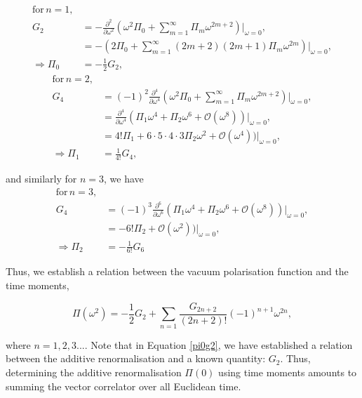 \documentclass{article}
\numberwithin{equation}{section} %
\begin{document}
\begin{equation}
\begin{split}
\mathrm{for}\, n=1,&\\
G_2 &= -\frac{\partial^{2}}{\partial \omega^{2}} (\omega^2 \Pi_0 + \sum_{m=1}^\infty \Pi_m \omega^{2m+2})\bigg \vert_{\omega=0} ,\\
&= -(2\Pi_0 + \sum_{m=1}^\infty (2m+2)(2m+1)\Pi_m \omega^{2m})\bigg \vert_{\omega=0} ,\\
\label{pi0g2}\Rightarrow \Pi_0 &= -\frac{1}{2}G_2,
\end{split}
\end{equation}
\begin{equation}
\begin{split}
\mathrm{for}\, n=2,&\\
G_4 &= (-1)^2\frac{\partial^{4}}{\partial \omega^{4}} (\omega^2 \Pi_0 + \sum_{m=1}^\infty \Pi_m \omega^{2m+2})\bigg \vert_{\omega=0} ,\\
&=  \frac{\partial^{4}}{\partial \omega^{4}}(\Pi_1 \omega^{4} + \Pi_2 \omega^{6} + \mathcal{O}(\omega^8))\bigg \vert_{\omega=0} ,\\
&= 4!\Pi_1 + 6\cdot 5\cdot 4\cdot 3\Pi_2 \omega^{2} + \mathcal{O}(\omega^4))\bigg \vert_{\omega=0} ,\\
\Rightarrow \Pi_1 &= \frac{1}{4!}G_4,
\end{split}
\end{equation}

\noindent and similarly for $n=3$, we have
\begin{equation}
\begin{split}
\mathrm{for}\, n=3,&\\
G_4 &= (-1)^3\frac{\partial^{6}}{\partial \omega^{6}} (\Pi_1 \omega^{4} + \Pi_2 \omega^{6} + \mathcal{O}(\omega^8))\bigg \vert_{\omega=0} ,\\
&=-6!\Pi_2 + \mathcal{O}(\omega^2))\bigg \vert_{\omega=0} ,\\
\Rightarrow \Pi_2 &= -\frac{1}{6!}G_6
\end{split}
\end{equation}

Thus, we establish a relation between the vacuum polarisation function and the time moments,

\begin{equation}
\Pi(\omega^2) = -\frac{1}{2}G_2 + \sum_{n=1} \frac{G_{2n+2}}{(2n+2)!}(-1)^{n+1} \omega^{2n},
\label{pi in terms of time moments}
\end{equation}

\noindent where $n=1,2,3...$. Note that in Equation \ref{pi0g2}, we have established a relation between the additive renormalisation and a known quantity: $G_2$. Thus, determining the additive renormalisation $\Pi(0)$ using time moments amounts to summing the vector correlator over all Euclidean time. 
\end{document}
